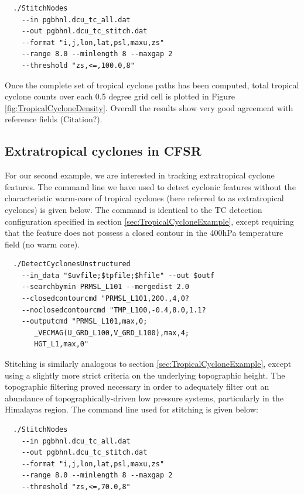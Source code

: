\documentclass[gmdd, hvmath, online]{copernicus_discussions}
\begin{document}
{\small \begin{verbatim}
  ./StitchNodes
    --in pgbhnl.dcu_tc_all.dat
    --out pgbhnl.dcu_tc_stitch.dat
    --format "i,j,lon,lat,psl,maxu,zs"
    --range 8.0 --minlength 8 --maxgap 2
    --threshold "zs,<=,100.0,8"
\end{verbatim}}

Once the complete set of tropical cyclone paths has been computed, total tropical cyclone counts over each 0.5 degree grid cell is plotted in Figure \ref{fig:TropicalCycloneDensity}.  Overall the results show very good agreement with reference fields ({\color{red}Citation?}).


\subsection{Extratropical cyclones in CFSR} \label{sec:ExtratropicalCycloneExample}

For our second example, we are interested in tracking extratropical cyclone features.  The command line we have used to detect cyclonic features without the characteristic warm-core of tropical cyclones (here referred to as extratropical cyclones) is given below.  The command is identical to the TC detection configuration specified in section \ref{sec:TropicalCycloneExample}, except requiring that the feature does not possess a closed contour in the 400hPa temperature field (no warm core).

{\small \begin{verbatim}
  ./DetectCyclonesUnstructured
    --in_data "$uvfile;$tpfile;$hfile" --out $outf
    --searchbymin PRMSL_L101 --mergedist 2.0
    --closedcontourcmd "PRMSL_L101,200.,4,0?
    --noclosedcontourcmd "TMP_L100,-0.4,8.0,1.1?
    --outputcmd "PRMSL_L101,max,0;
       _VECMAG(U_GRD_L100,V_GRD_L100),max,4;
       HGT_L1,max,0"
\end{verbatim}}

Stitching is similarly analogous to section \ref{sec:TropicalCycloneExample}, except using a slightly more strict criteria on the underlying topographic height.  The topographic filtering proved necessary in order to adequately filter out an abundance of topographically-driven low pressure systems, particularly in the Himalayas region.  The command line used for stitching is given below:

{\small \begin{verbatim}
  ./StitchNodes
    --in pgbhnl.dcu_tc_all.dat
    --out pgbhnl.dcu_tc_stitch.dat
    --format "i,j,lon,lat,psl,maxu,zs"
    --range 8.0 --minlength 8 --maxgap 2
    --threshold "zs,<=,70.0,8"
\end{verbatim}}
\end{document}
